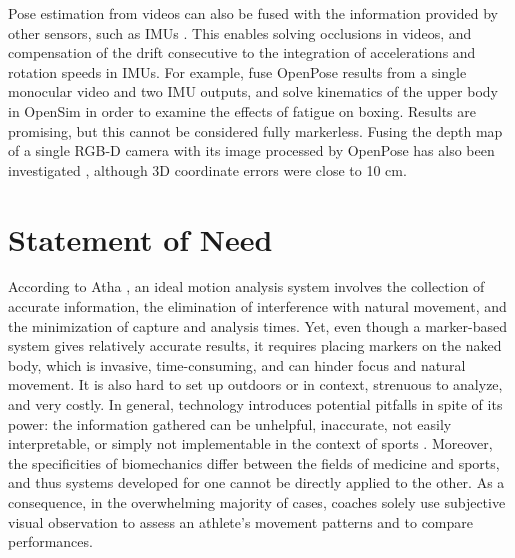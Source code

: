 Pose estimation from videos can also be fused with the information provided by other sensors, such as IMUs \cite{Bao2022, Zhang2020}. This enables solving occlusions in videos, and compensation of the drift consecutive to the integration of accelerations and rotation speeds in IMUs. For example, \cite{Haralabidis2020} fuse OpenPose results from a single monocular video and two IMU outputs, and solve kinematics of the upper body in OpenSim in order to examine the effects of fatigue on boxing. Results are promising, but this cannot be considered fully markerless. Fusing the depth map of a single RGB-D camera with its image processed by OpenPose has also been investigated \cite{Liu2022c}, although 3D coordinate errors were close to 10 cm.

\medskip

\newpage
\section{Statement of Need}\label{sec:statement of need}

According to Atha \cite{Atha1984}, an ideal motion analysis system involves the collection of accurate information, the elimination of interference with natural movement, and the minimization of capture and analysis times. Yet, even though a marker-based system gives relatively accurate results, it requires placing markers on the naked body, which is invasive, time-consuming, and can hinder focus and natural movement. It is also hard to set up outdoors or in context, strenuous to analyze, and very costly. In general, technology introduces potential pitfalls in spite of its power: the information gathered can be unhelpful, inaccurate, not easily interpretable, or simply not implementable in the context of sports \cite{Windt2020}. Moreover, the specificities of biomechanics differ between the fields of medicine and sports, and thus systems developed for one cannot be directly applied to the other. As a consequence, in the overwhelming majority of cases, coaches solely use subjective visual observation to assess an athlete's movement patterns and to compare performances. 

